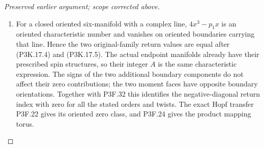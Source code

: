 \begin{proof}[Preserved earlier argument; scope corrected above]
\begin{enumerate}[label=\arabic*.]
\item For a closed oriented six-manifold with a complex line,
\(4x^3-p_1x\) is an oriented characteristic number and
vanishes on oriented boundaries carrying that line.  Hence
the two original-family return values are equal after
(P3K.17.4) and (P3K.17.5).  The actual endpoint manifolds
already have their prescribed spin structures, so their
integer \(A\) is the same characteristic expression.
The signs of the two additional boundary components do not
affect their zero contributions; the two moment faces have
opposite boundary orientations.  Together with P3F.32 this identifies the negative-diagonal
return index with zero for all the stated orders and twists.
The exact Hopf transfer P3F.22 gives its oriented zero class,
and P3F.24 gives the product mapping torus.

\end{enumerate}
\end{proof}